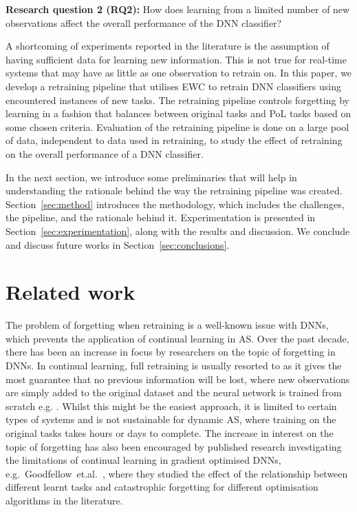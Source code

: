 \textbf{Research question 2 (RQ2):} How does learning from a limited number of new observations affect the overall performance of the DNN classifier?  


A shortcoming of experiments reported in the literature is the assumption of having sufficient data for learning new information. 
%
This is not true for real-time systems that may have as little as one observation to retrain on.
%
In this paper, we develop a retraining pipeline that utilises EWC to retrain DNN classifiers using encountered instances of new tasks.
%
The retraining pipeline controls forgetting by learning in a fashion that balances between original tasks and PoL tasks based on some chosen criteria.
%
Evaluation of the retraining pipeline is done on a large pool of data, independent to data used in retraining, to study the effect of retraining on the overall performance of a DNN classifier.

In the next section, we introduce some preliminaries that will help in understanding the rationale behind the way the retraining pipeline was created. 
%
Section~\ref{sec:method} introduces the methodology, which includes the challenges, the pipeline, and the rationale behind it.
%
Experimentation is presented in Section~\ref{sec:experimentation}, along with the results and discussion. 
%
We conclude and discuss future works in Section~\ref{sec:conclusions}.


\section{Related work}

The problem of forgetting when retraining is a well-known issue with DNNs, which prevents the application of continual learning in AS.
%
Over the past decade, there has been an increase in focus by researchers on the topic of forgetting in DNNs. 
%
In continual learning, full retraining is usually resorted to as it gives the most guarantee that no previous information will be lost, where new observations are simply added to the original dataset and the neural network is trained from scratch e.g. \cite{Stocco2021}. 
%
Whilst this might be the easiest approach, it is limited to certain types of systems and is not sustainable for dynamic AS, where training on the original tasks takes hours or days to complete.
%
The increase in interest on the topic of forgetting has also been encouraged by published research investigating the limitations of continual learning in gradient optimised DNNs, e.g.~Goodfellow~et.al.~\cite{Goodfellow2014}, where they studied the effect of the relationship between different learnt tasks and catastrophic forgetting for different optimisation algorithms in the literature. 

